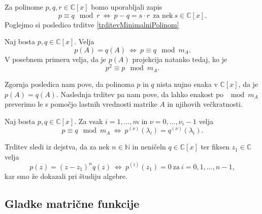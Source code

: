 \documentclass[mat1]{fmfdelo}
\newcommand{\N}{\mathbb N}
\newcommand{\C}{\mathbb C}
\begin{document}
Za polinome $p, q, r \in \C [x]$ bomo uporabljali zapis
\begin{equation}
    p \equiv q \mod r\  \Longleftrightarrow\  p - q = s\cdot r\ \  \text{za nek}\  s\in \C [x].
\end{equation}
Poglejmo si posledico trditve \ref{trditevMinimalniPolinom}
\begin{posledica} \label{posledicaProjekcija}
    Naj bosta $p, q \in \C [x]$. Velja
    \begin{equation}
        p(A) = q(A)\  \Longleftrightarrow\ p \equiv q \mod m_A.
    \end{equation}
    V posebnem primeru velja, da je $p(A)$ projekcija natanko tedaj, ko je
    \begin{equation}
        p^2 \equiv p \mod m_A.
    \end{equation}
\end{posledica}
Zgornja posledica nam pove, da polinoma $p$ in $q$ nista nujno enaka v $\C [x]$, da je $p(A) = q(A)$. Naslednja trditev pa nam pove, da lahko enakost po $\mod m_A$ preverimo le s pomočjo lastnih vrednosti matrike $A$ in njihovih večkratnosti.
\begin{trditev} \label{trditevPosploseniMinimalni}
    Naj bosta $p, q \in \C [x]$. Za vsak $i = 1, \ldots, m$ in $\nu = 0, \ldots, \nu_i-1$ velja
    \begin{equation}
        p \equiv q \mod m_A \ \Longleftrightarrow\  p^{(\nu)}(\lambda_i) = q^{(\nu)}(\lambda_i).
    \end{equation}
\end{trditev}
\begin{dokaz}
    Trditev sledi iz dejstva, da za nek $n\in \N$ in neničeln $q \in \C [x]$ ter fiksen $z_1 \in \C$ velja
    \begin{equation*}
        p(z) = (z-z_1)^n q(z) \ \Longleftrightarrow\  p^{(i)}(z_1)=0 \ \text{za}\  i=0, 1, \ldots, n-1,
    \end{equation*}
    kar smo že dokazali pri študiju algebre.
\end{dokaz}

\subsection{Gladke matrične funkcije}
\end{document}
